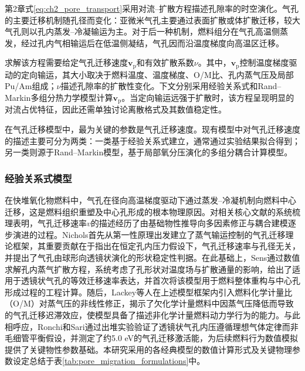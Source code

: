 第2章式\eqref{eq:ch2_pore_transport}采用对流--扩散方程描述孔隙率的时空演化。气孔的主要迁移机制随孔径而变化：亚微米气孔主要通过表面扩散或体扩散迁移，较大气孔则以孔内蒸发--冷凝输运为主\cite{kanekoCalculationProgramMIVOID1969,vanceComputerSimulationPore2017,sensKineticsPoreMovement1972,ronchiPropertiesLenticularPores1974,novasconeModelingPorosityMigration2018,wellandMatterTransportFast2020}。对于后一种机制，燃料组分在气孔高温侧蒸发，经过孔内气相输运后在低温侧凝结，气孔因而沿温度梯度向高温区迁移\cite{sensKineticsPoreMovement1972}。

求解该方程需要给定气孔迁移速度$\mathbf v_{\mathrm p}$和有效扩散系数$\nu$。其中，$\mathbf v_{\mathrm p}$控制温度梯度驱动的定向输运，其大小取决于燃料温度、温度梯度、O/M比、孔内蒸气压及局部Pu/Am组成；$\nu$描述孔隙率的扩散性变化。下文分别采用经验关系式和Rand--Markin多组分热力学模型计算$\mathbf v_{\mathrm p}$。当定向输运远强于扩散时，该方程呈现明显的对流占优特征，因此还需单独讨论离散格式及其数值稳定性。

在气孔迁移模型中，最为关键的参数是气孔迁移速度。现有模型中对气孔迁移速度的描述主要可分为两类：一类基于经验关系式建立，通常通过实验结果拟合得到\cite{ronchiPropertiesLenticularPores1974,sensKineticsPoreMovement1972,nicholsTheoryColumnarGrain1967}；另一类则源于Rand--Markin模型\cite{olanderFundamentalAspectsNuclear1976}，基于局部氧分压演化的多组分耦合计算模型\cite{ikusawaDevelopmentVerificationThermal2014}。

\subsubsection{经验关系式模型}
在快堆氧化物燃料中，气孔在径向高温梯度驱动下通过蒸发--冷凝机制向燃料中心迁移，这是燃料组织重塑及中心孔形成的根本物理原因。对相关核心文献的系统梳理表明，气孔迁移速率$v$的描述经历了由基础物性推导向多因素修正与耦合建模逐步演进的过程。Nichols\cite{nicholsTheoryColumnarGrain1967,nicholsDiffusionalMobilitiesParticles1972}首先从第一性原理出发建立了蒸气输运控制的气孔迁移理论框架，其重要贡献在于指出在恒定孔内压力假设下，气孔迁移速率与孔径无关，并提出了气孔由球形向透镜状演化的形状稳定性判据。在此基础上，Sens\cite{sensKineticsPoreMovement1972}通过数值求解孔内蒸气扩散方程，系统考虑了孔形状对温度场与扩散通量的影响，给出了适用于透镜状气孔的等效迁移速率表达，并首次将该模型用于燃料整体重构与中心孔形成过程的工程计算。随后，Lackey等人\cite{lackeyPorosityActinideRedistribution1972}在上述模型框架内引入燃料化学计量比（O/M）对蒸气压的非线性修正，揭示了欠化学计量燃料中因蒸气压降低而导致的气孔迁移迟滞效应，使模型具备了描述非化学计量燃料动力学行为的能力。与此相呼应，Ronchi和Sari\cite{ronchiPropertiesLenticularPores1974}通过出堆实验验证了透镜状气孔内压遵循理想气体定律而非毛细管平衡假设，并测定了约5.0 eV的气孔迁移激活能，为后续燃料行为数值模拟提供了关键物性参数基础。本研究采用的各经典模型的数值计算形式及关键物理参数设定总结于表\ref{tab:pore_migration_formulations}中。

